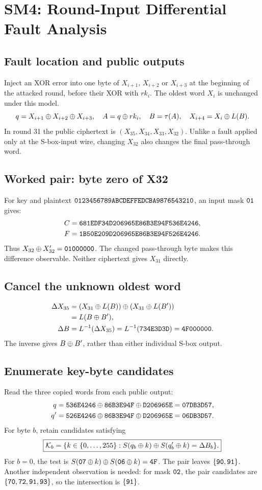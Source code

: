 \chapter{SM4: Round-Input Differential Fault Analysis}
\section{Fault location and public outputs}
Inject an XOR error into one byte of $X_{i+1}$, $X_{i+2}$ or $X_{i+3}$ at the beginning of the attacked round, before their XOR with $rk_i$. The oldest word $X_i$ is unchanged under this model.
\[
q=X_{i+1}\mathbin{\oplus} X_{i+2}\mathbin{\oplus} X_{i+3},\quad
A=q\mathbin{\oplus} rk_i,\quad B=\tau(A),\quad X_{i+4}=X_i\mathbin{\oplus} L(B).
\]
In round 31 the public ciphertext is $(X_{35},X_{34},X_{33},X_{32})$. Unlike a fault applied only at the S-box-input wire, changing $X_{32}$ also changes the final pass-through word.
\section{Worked pair: byte zero of X32}
For key and plaintext $\texttt{0123456789ABCDEFFEDCBA9876543210}$, an input mask $\texttt{01}$ gives:
\begin{align*}
C&=\texttt{681EDF34D206965E86B3E94F536E4246},\\
F&=\texttt{1B50E209D206965E86B3E94F526E4246}.
\end{align*}
Thus $X_{32}\mathbin{\oplus} X'_{32}=\texttt{01000000}$. The changed pass-through byte makes this difference observable. Neither ciphertext gives $X_{31}$ directly.
\section{Cancel the unknown oldest word}
\begin{align*}
\Delta X_{35}
&=(X_{31}\mathbin{\oplus} L(B))\mathbin{\oplus}(X_{31}\mathbin{\oplus} L(B'))\\
&=L(B\mathbin{\oplus} B'),\\
\Delta B&=L^{-1}(\Delta X_{35})
=L^{-1}(\texttt{734E3D3D})=\texttt{4F000000}.
\end{align*}
The inverse gives $B\mathbin{\oplus} B'$, rather than either individual S-box output.
\section{Enumerate key-byte candidates}
Read the three copied words from each public output:
\begin{align*}
q&=\texttt{536E4246}\mathbin{\oplus}\texttt{86B3E94F}\mathbin{\oplus}\texttt{D206965E}=\texttt{07DB3D57},\\
q'&=\texttt{526E4246}\mathbin{\oplus}\texttt{86B3E94F}\mathbin{\oplus}\texttt{D206965E}=\texttt{06DB3D57}.
\end{align*}
For byte $b$, retain candidates satisfying
\[
\boxed{\mathcal K_b=\{k\in\{0,\ldots,255\}:S(q_b\mathbin{\oplus} k)\mathbin{\oplus} S(q'_b\mathbin{\oplus} k)=\Delta B_b\}.}
\]
For $b=0$, the test is $S(\texttt{07}\mathbin{\oplus} k)\mathbin{\oplus} S(\texttt{06}\mathbin{\oplus} k)=\texttt{4F}$. The pair leaves $\{\texttt{90},\texttt{91}\}$. Another independent observation is needed: for mask $\texttt{02}$, the pair candidates are $\{\texttt{70},\texttt{72},\texttt{91},\texttt{93}\}$, so the intersection is $\{\texttt{91}\}$.
